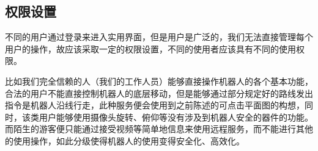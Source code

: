 
\subsection{权限设置}




不同的用户通过登录来进入实用界面，但是用户是广泛的，我们无法直接管理每个用户的操作，故应该采取一定的权限设置，不同的使用者应该具有不同的使用权限。

比如我们完全信赖的人（我们的工作人员）能够直接操作机器人的各个基本功能，合法的用户不能直接控制机器人的底层移动，但是能够通过部分规定好的路线发出指令是机器人沿线行走，此种服务便会使用到之前陈述的可点击平面图的构想，同时，该类用户能够使用摄像头旋转、俯仰等没有涉及到机器人安全的器件的功能。而陌生的游客便只能通过接受视频等简单地信息来使用远程服务，而不能进行其他的使用操作，如此分级使得机器人的使用变得安全化、高效化。

